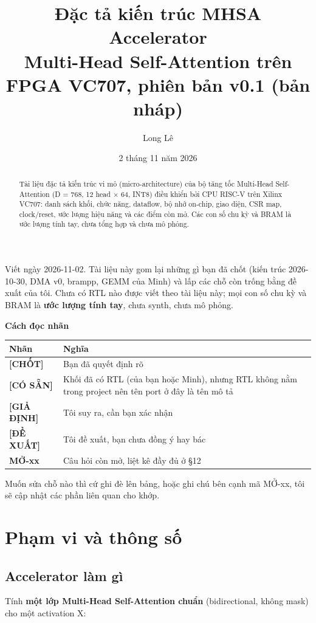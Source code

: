 \documentclass[11pt,a4paper]{article}
\title{\sffamily\bfseries Đặc tả kiến trúc MHSA Accelerator\\[0.3em]
\large\mdseries Multi-Head Self-Attention trên FPGA VC707, phiên bản v0.1 (bản nháp)}
\author{Long Lê}
\date{2 tháng 11 năm 2026}
\renewcommand{\_}{\oldus\allowbreak}
\newcommand{\statustag}[2]{\textsf{\footnotesize\bfseries\color{#1}[#2]}}
\newcommand{\tagchot}{\statustag{ForestGreen}{CHỐT}}
\newcommand{\tagcosan}{\statustag{NavyBlue}{CÓ SẴN}}
\newcommand{\taggiadinh}{\statustag{BurntOrange}{GIẢ ĐỊNH}}
\newcommand{\tagdexuat}{\statustag{Purple}{ĐỀ XUẤT}}
\begin{document}
\maketitle
\begin{abstract}
\noindent Tài liệu đặc tả kiến trúc vi mô (micro-architecture) của bộ tăng tốc
Multi-Head Self-Attention (D = 768, 12 head × 64, INT8) điều khiển bởi CPU RISC-V trên
Xilinx VC707: danh sách khối, chức năng, dataflow, bộ nhớ on-chip, giao diện, CSR map,
clock/reset, ước lượng hiệu năng và các điểm còn mở. Các con số chu kỳ và BRAM là ước
lượng tính tay, chưa tổng hợp và chưa mô phỏng.
\end{abstract}
\tableofcontents
\clearpage

Viết ngày 2026-11-02. Tài liệu này gom lại những gì bạn đã chốt (kiến
trúc 2026-10-30, DMA v0, bram\_pp, GEMM của Minh) và lấp các chỗ còn
trống bằng đề xuất của tôi. Chưa có RTL nào được viết theo tài liệu này;
mọi con số chu kỳ và BRAM là \textbf{ước lượng tính tay}, chưa synth,
chưa mô phỏng.

\textbf{Cách đọc nhãn}

\begin{xltabular}{\linewidth}{@{}L{0.16}Y@{}}
\toprule
\textbf{Nhãn} & \textbf{Nghĩa} \\
\midrule
\endhead
\bottomrule
\endlastfoot
\tagchot{} & Bạn đã quyết định rõ \\
\tagcosan{} & Khối đã có RTL (của bạn hoặc Minh), nhưng RTL không nằm trong project nên tên port ở đây là tên mô tả \\
\taggiadinh{} & Tôi suy ra, cần bạn xác nhận \\
\tagdexuat{} & Tôi đề xuất, bạn chưa đồng ý hay bác \\
\textbf{MỞ-xx} & Câu hỏi còn mở, liệt kê đầy đủ ở §12 \\
\end{xltabular}

Muốn sửa chỗ nào thì cứ ghi đè lên bảng, hoặc ghi chú bên cạnh mã MỞ-xx,
tôi sẽ cập nhật các phần liên quan cho khớp.

\section{Phạm vi và thông số}

\subsection{Accelerator làm gì}

Tính \textbf{một lớp Multi-Head Self-Attention chuẩn} (bidirectional,
không mask) cho một activation X:
\end{document}
